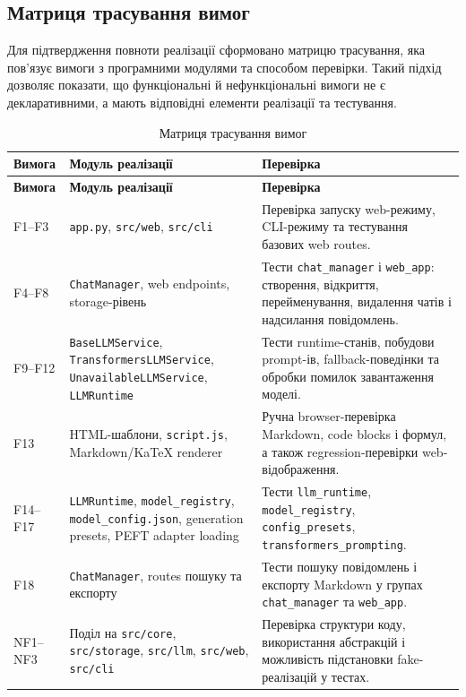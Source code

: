 \subsection{Матриця трасування вимог}

Для підтвердження повноти реалізації сформовано матрицю трасування, яка пов'язує вимоги з програмними модулями та способом перевірки. Такий підхід дозволяє показати, що функціональні й нефункціональні вимоги не є декларативними, а мають відповідні елементи реалізації та тестування.

\small
\begin{longtable}{|p{2.2cm}|p{5.2cm}|p{7.2cm}|}
\caption{Матриця трасування вимог}
\label{tab:requirements-traceability}\\
\hline
\textbf{Вимога} & \textbf{Модуль реалізації} & \textbf{Перевірка} \\
\hline
\endfirsthead
\hline
\textbf{Вимога} & \textbf{Модуль реалізації} & \textbf{Перевірка} \\
\hline
\endhead
F1--F3 & \texttt{app.py}, \texttt{src/web}, \texttt{src/cli} & Перевірка запуску web-режиму, CLI-режиму та тестування базових web routes. \\
\hline
F4--F8 & \texttt{ChatManager}, web endpoints, storage-рівень & Тести \texttt{chat\_manager} і \texttt{web\_app}: створення, відкриття, перейменування, видалення чатів і надсилання повідомлень. \\
\hline
F9--F12 & \texttt{BaseLLMService}, \texttt{TransformersLLMService}, \texttt{UnavailableLLMService}, \texttt{LLMRuntime} & Тести runtime-станів, побудови prompt-ів, fallback-поведінки та обробки помилок завантаження моделі. \\
\hline
F13 & HTML-шаблони, \texttt{script.js}, Markdown/KaTeX renderer & Ручна browser-перевірка Markdown, code blocks і формул, а також regression-перевірки web-відображення. \\
\hline
F14--F17 & \texttt{LLMRuntime}, \texttt{model\_registry}, \texttt{model\_config.json}, generation presets, PEFT adapter loading & Тести \texttt{llm\_runtime}, \texttt{model\_registry}, \texttt{config\_presets}, \texttt{transformers\_prompting}. \\
\hline
F18 & \texttt{ChatManager}, routes пошуку та експорту & Тести пошуку повідомлень і експорту Markdown у групах \texttt{chat\_manager} та \texttt{web\_app}. \\
\hline
NF1--NF3 & Поділ на \texttt{src/core}, \texttt{src/storage}, \texttt{src/llm}, \texttt{src/web}, \texttt{src/cli} & Перевірка структури коду, використання абстракцій і можливість підстановки fake-реалізацій у тестах. \\

\end{longtable}
